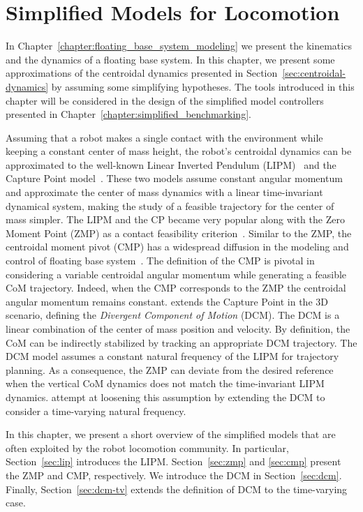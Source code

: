 
\chapter{Simplified Models for Locomotion\label{chapter:simplified_model_for_locomotion}}  %

\ifpdf
    \graphicspath{{chapter_simplified_models/figures/Raster/}{chapter_simplified_models/figures/PDF/}{chapter_simplified_models/figures/}}
\else
    \graphicspath{{chapter_simplified_models/figures/Vector/}{chapter_simplified_models/figures/}}
\fi

In Chapter~\ref{chapter:floating_base_system_modeling} we present the kinematics and the dynamics of a floating base system. In this chapter, we present some approximations of the centroidal dynamics presented in Section~\ref{sec:centroidal-dynamics} by assuming some simplifying hypotheses. The tools introduced in this chapter will be considered in the design of the simplified model controllers presented in Chapter~\ref{chapter:simplified_benchmarking}.
\par
Assuming that a robot makes a single contact with the environment while keeping a constant center of mass height, the robot's centroidal dynamics can be approximated to the well-known Linear Inverted Pendulum (LIPM)~\citep{Kajita2001, Kajita2003} and the Capture Point model~\citep{Pratt2006}. These two models assume constant angular momentum and approximate the center of mass dynamics with a linear time-invariant dynamical system, making the study of a feasible trajectory for the center of mass simpler. The LIPM and the CP became very popular along with the Zero Moment Point (ZMP) as a contact feasibility criterion~\citep{Vukobratovic1969}. Similar to the ZMP, the centroidal moment pivot (CMP) has a widespread diffusion in the modeling and control of floating base system~\citep{Li2020Centroidal-momentum-basedLocomotion,Seyde2018InclusionWalking,Hopkins2015,Popovic2005,Shafiee-Ashtiani2017PushControl}. The definition of the CMP is pivotal in considering a variable centroidal angular momentum while generating a feasible CoM trajectory. Indeed, when the CMP corresponds to the ZMP the centroidal angular momentum remains constant. 
\cite{Englsberger2011,Englsberger2015} extends the Capture Point in the 3D scenario, defining the \emph{Divergent Component of Motion} (DCM). The DCM is a linear combination of the center of mass position and velocity. By definition, the CoM can be indirectly
stabilized by tracking an appropriate DCM trajectory. The DCM model assumes a constant natural frequency of the LIPM for trajectory planning. As a consequence, the ZMP can deviate from the desired reference when the vertical CoM dynamics does not match the time-invariant LIPM dynamics.
\cite{Hopkins2015} attempt at loosening this assumption by extending the DCM to consider a time-varying natural frequency.
\par
In this chapter, we present a short overview of the simplified models that are often exploited by the robot locomotion community. In particular, Section~\ref{sec:lip} introduces the LIPM. Section~\ref{sec:zmp} and \ref{sec:cmp} present the ZMP and CMP, respectively. We introduce the DCM in Section~\ref{sec:dcm}. Finally, Section~\ref{sec:dcm-tv} extends the definition of DCM to the time-varying case. 






